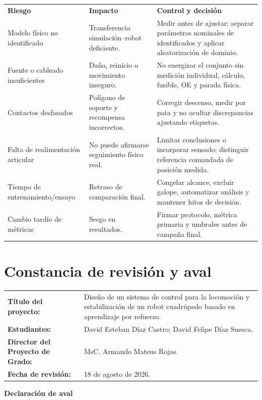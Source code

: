 \documentclass[10pt,letterpaper]{article}
\begin{document}
\begin{tabularx}{\textwidth}{p{4.2cm}Yp{5.2cm}}
\color{white}\textbf{Riesgo} & \color{white}\textbf{Impacto} & \color{white}\textbf{Control y decisión}\\
Modelo físico no identificado & Transferencia simulación--robot deficiente. & Medir antes de ajustar; separar parámetros nominales de identificados y aplicar aleatorización de dominio.\\
Fuente o cableado insuficientes & Daño, reinicio o movimiento inseguro. & No energizar el conjunto sin medición individual, cálculo, fusible, OE y parada física.\\
Contactos desfasados & Polígono de soporte y recompensa incorrectos. & Corregir descenso, medir por pata y no ocultar discrepancias ajustando etiquetas.\\
Falta de realimentación articular & No puede afirmarse seguimiento físico real. & Limitar conclusiones o incorporar sensado; distinguir referencia comandada de posición medida.\\
Tiempo de entrenamiento/ensayo & Retraso de comparación final. & Congelar alcance, excluir galope, automatizar análisis y mantener hitos de decisión.\\
Cambio tardío de métricas & Sesgo en resultados. & Firmar protocolo, métrica primaria y umbrales antes de campaña final.\\
\end{tabularx}

\newpage
\section{Constancia de revisión y aval}

\renewcommand{\arraystretch}{1.6}
\begin{tabularx}{\textwidth}{p{5cm}Y}
\textbf{Título del proyecto:} & Diseño de un sistema de control para la locomoción y estabilización de un robot cuadrúpedo basado en aprendizaje por refuerzo.\\
\textbf{Estudiantes:} & David Esteban Díaz Castro; David Felipe Díaz Suesca.\\
\textbf{Director del Proyecto de Grado:} & MsC. Armando Mateus Rojas.\\
\textbf{Fecha de revisión:} & 18 de agosto de 2026.\\
\end{tabularx}

\vspace{0.8cm}
\textbf{Declaración de aval}
\end{document}
